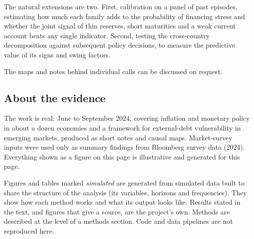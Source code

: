 \documentclass[
  british,
  a4paper,
]{article}
\begin{document}
The natural extensions are two. First, calibration on a panel of past
episodes, estimating how much each family adds to the probability of
financing stress and whether the joint signal of thin reserves, short
maturities and a weak current account beats any single indicator.
Second, testing the cross-country decomposition against subsequent
policy decisions, to measure the predictive value of its signs and swing
factors.

The maps and notes behind individual calls can be discussed on request.

\subsection{About the evidence}\label{about-the-evidence}

The work is real: June to September 2024, covering inflation and
monetary policy in about a dozen economies and a framework for
external-debt vulnerability in emerging markets, produced as short notes
and causal maps. Market-survey inputs were used only as summary findings
from Bloomberg survey data (2024). Everything shown as a figure on this
page is illustrative and generated for this page.

Figures and tables marked \emph{simulated} are generated from simulated
data built to share the structure of the analysis (its variables,
horizons and frequencies). They show how each method works and what its
output looks like. Results stated in the text, and figures that give a
source, are the project's own. Methods are described at the level of a
methods section. Code and data pipelines are not reproduced here.
\end{document}
